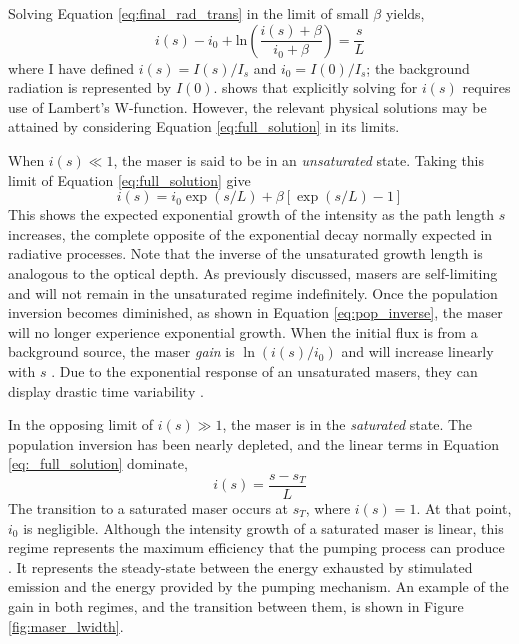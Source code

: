 Solving Equation \ref{eq:final_rad_trans} in the limit of small $\beta$ yields,
\begin{equation}
\label{eq:full_solution}
i(s) - i_0 + \mathrm{ln}\left( \frac{i(s) + \beta}{i_0 + \beta} \right) = \frac{s}{L}
\end{equation}
where I have defined $i(s) = I(s)/I_s$ and $i_0 = I(0)/I_s$; the background radiation is represented by $I(0)$. \citet{Gray_2009} shows that explicitly solving for $i(s)$ requires use of Lambert's W-function. However, the relevant physical solutions may be attained by considering Equation \ref{eq:full_solution} in its limits.

When $i(s)\ll 1$, the maser is said to be in an {\it unsaturated} state. Taking this limit of Equation \ref{eq:full_solution} give
\begin{equation}
\label{eq:unsat_solution}
i(s) = i_0 \exp\left(s/L\right) + \beta\left[ \exp\left(s/L\right) - 1 \right]
\end{equation}
This shows the expected exponential growth of the intensity as the path length $s$ increases, the complete opposite of the exponential decay normally expected in radiative processes. Note that the inverse of the unsaturated growth length is analogous to the optical depth. As previously discussed, masers are self-limiting and will not remain in the unsaturated regime indefinitely. Once the population inversion becomes diminished, as shown in Equation \ref{eq:pop_inverse}, the maser will no longer experience exponential growth. When the initial flux is from a background source, the maser {\it gain} is $\ln \left( i(s)/i_0 \right)$ and will increase linearly with $s$ \citet{stahler_palla_2004}. Due to the exponential response of an unsaturated masers, they can display drastic time variability \citep{Elitzur_1992}. 

In the opposing limit of $i(s) \gg 1$, the maser is in the {\it saturated} state. The population inversion has been nearly depleted, and the linear terms in Equation \ref{eq:_full_solution} dominate,
\begin{equation}
\label{eq:sat_solution}
i(s) = \frac{s-s_{T}}{L}
\end{equation}
The transition to a saturated maser occurs at $s_T$, where $i(s)=1$. At that point, $i_0$ is negligible. Although the intensity growth of a saturated maser is linear, this regime represents the maximum efficiency that the pumping process can produce \citep{elitzur1992_text}. It represents the steady-state between the energy exhausted by stimulated emission and the energy provided by the pumping mechanism. An example of the gain in both regimes, and the transition between them, is shown in Figure \ref{fig:maser_lwidth}.


